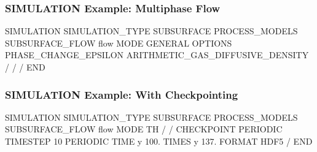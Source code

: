 \begin{frame}[fragile]\frametitle{SIMULATION Example: Multiphase Flow}

\begin{semiverbatim}
SIMULATION
  SIMULATION_TYPE SUBSURFACE
  PROCESS_MODELS
    SUBSURFACE_FLOW flow
      MODE GENERAL
      OPTIONS
        PHASE_CHANGE_EPSILON
        ARITHMETIC_GAS_DIFFUSIVE_DENSITY
      /
    /
  /
END
\end{semiverbatim}

\end{frame}

\begin{frame}[fragile]\frametitle{SIMULATION Example: With Checkpointing}
\begin{semiverbatim}
SIMULATION
  SIMULATION_TYPE SUBSURFACE
  PROCESS_MODELS
    SUBSURFACE_FLOW flow
      MODE TH
    /
  /
  CHECKPOINT
    PERIODIC TIMESTEP 10
    PERIODIC TIME y 100.
    TIMES y 137.
    FORMAT HDF5
  /
END
\end{semiverbatim}

\end{frame}
